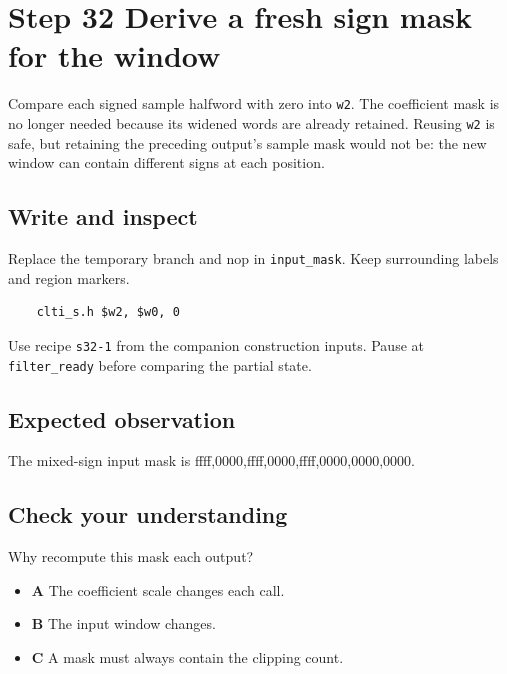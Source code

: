 \section{Step 32 Derive a fresh sign mask for the window}\label{fir-s32}

Compare each signed sample halfword with zero into \texttt{w2}. The coefficient mask is no longer needed because its widened words are already retained. Reusing \texttt{w2} is safe, but retaining the preceding output’s sample mask would not be: the new window can contain different signs at each position.

\subsection{Write and inspect}
Replace the temporary branch and nop in \texttt{input\_mask}. Keep surrounding labels and region markers.

\begin{verbatim}
    clti_s.h $w2, $w0, 0
\end{verbatim}
Use recipe \texttt{s32-1} from the companion construction inputs. Pause at \texttt{filter\_ready} before comparing the partial state.

\subsection{Expected observation}
The mixed-sign input mask is ffff,0000,ffff,0000,ffff,0000,0000,0000.

\subsection{Check your understanding}
Why recompute this mask each output?

\begin{itemize}
  \item \textbf{A} The coefficient scale changes each call.
  \item \textbf{B} The input window changes.
  \item \textbf{C} A mask must always contain the clipping count.
\end{itemize}
